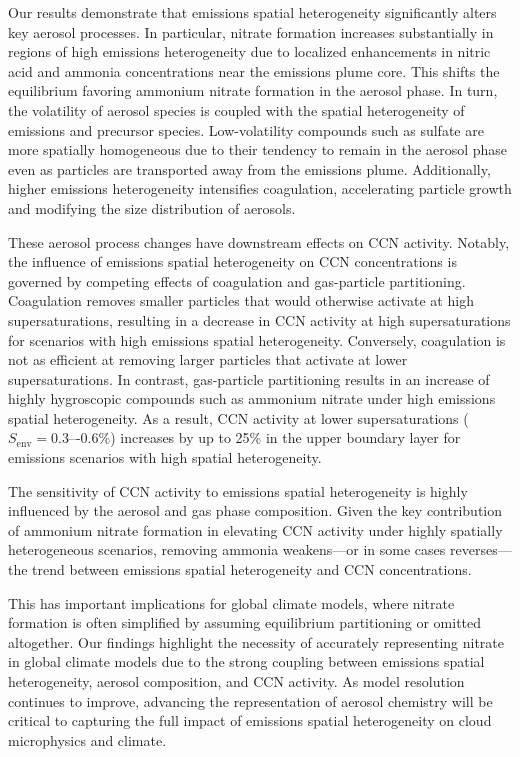 \documentclass[acp, manuscript]{copernicus}
\begin{document}
Our results demonstrate that emissions spatial heterogeneity
significantly alters key aerosol processes. In particular, nitrate
formation increases substantially in regions of high emissions
heterogeneity due to localized enhancements in nitric acid and ammonia
concentrations near the emissions plume core. This shifts the
equilibrium favoring ammonium nitrate formation in the aerosol
phase. In turn, the volatility of aerosol species is coupled with the
spatial heterogeneity of emissions and precursor species.
Low-volatility compounds such as sulfate are more spatially
homogeneous due to their tendency to remain in the aerosol phase even
as particles are transported away from the emissions plume.
Additionally, higher emissions heterogeneity intensifies coagulation,
accelerating particle growth and modifying the size distribution of
aerosols.

These aerosol process changes have downstream effects on CCN
activity. Notably, the influence of emissions spatial heterogeneity on
CCN concentrations is governed by competing effects of coagulation and
gas-particle partitioning. Coagulation removes smaller particles that
would otherwise activate at high supersaturations, resulting in a
decrease in CCN activity at high supersaturations for scenarios with
high emissions spatial heterogeneity. Conversely, coagulation is not
as efficient at removing larger particles that activate at lower
supersaturations. In contrast, gas-particle partitioning results in an
increase of highly hygroscopic compounds such as ammonium nitrate
under high emissions spatial heterogeneity. As a result, CCN activity
at lower supersaturations ($S_{\mathrm{env}} = 0.3\mbox{–-}0.6\%$) increases by up to
25\% in the upper boundary layer for emissions scenarios with high
spatial heterogeneity.

The sensitivity of CCN activity to emissions spatial heterogeneity is highly
influenced by the aerosol and gas phase composition. Given the key
contribution of ammonium nitrate formation in elevating CCN activity
under highly spatially heterogeneous scenarios, removing ammonia
weakens---or in some cases reverses---the trend between emissions
spatial heterogeneity and CCN concentrations.

This has important implications for global climate models, where 
nitrate formation is often simplified by assuming equilibrium partitioning 
or omitted altogether. Our findings highlight the necessity of accurately 
representing nitrate in global climate models due to the strong coupling 
between emissions spatial heterogeneity, aerosol composition, and 
CCN activity. As model resolution continues to improve, advancing the 
representation of aerosol chemistry will be critical to capturing the full impact of
emissions spatial heterogeneity on cloud microphysics and climate.
\end{document}
